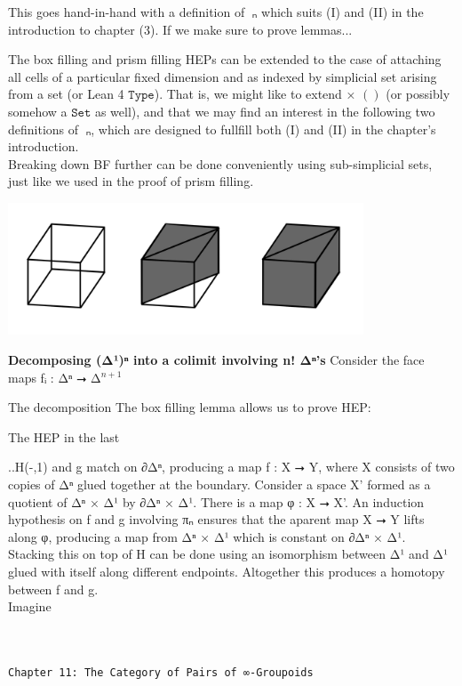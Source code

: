 \documentclass{book}
\theoremstyle{definition}
\renewcommand{\chapter}[1]{
\newpage
{
\Huge 
\begin{center}
\ \\
\ \\
\thispagestyle{empty}
\texttt{#1}
\end{center}}
\ \\
\ \\
}
\begin{document}
This goes hand-in-hand with a definition of π⃗ₙ which suits (I) and (II) in the introduction to chapter (3). If we make sure to prove lemmas... 

The box filling and prism filling HEPs can be extended to the case of attaching all cells of a particular fixed dimension and as indexed by simplicial set arising from a set (or Lean 4 $\texttt{Type}$). That is, we might like to extend × $()$ (or possibly somehow a $\texttt{Set}$ as well), and that we may find an interest in the following two definitions of π⃗ₙ, which are designed to fullfill both (I) and (II) in the chapter's introduction.\\

Breaking down BF further can be done conveniently using sub-simplicial sets, just like we used in the proof of prism filling. 

\begin{center}
\includegraphics[width=300pt]{boxfilling.png}
\end{center}


{\bf Decomposing (Δ¹)ⁿ into a colimit involving n! Δⁿ's} Consider the face maps fᵢ : Δⁿ ⭢ Δ${}^{n+1}$


The decomposition 
The box filling lemma allows us to prove HEP:


The HEP in the last 

..H(-,1) and g match on ∂Δⁿ, producing a map f : X ⭢ Y, where X consists of two copies of Δⁿ glued together at the boundary. Consider a space X' formed as a quotient of Δⁿ × Δ¹ by ∂Δⁿ × Δ¹. There is a map φ : X ⭢ X'. An induction hypothesis on f and g involving πₙ ensures that the aparent map X ⭢ Y lifts along φ, producing a map from Δⁿ × Δ¹ which is constant on ∂Δⁿ × Δ¹. Stacking this on top of H can be done using an isomorphism between Δ¹ and Δ¹ glued with itself along different endpoints. Altogether this produces a homotopy between f and g.\\

Imagine 


\chapter{Chapter 11: The Category of Pairs of ∞-Groupoids}
\end{document}
